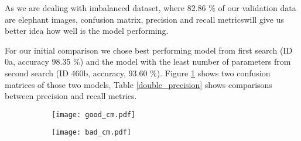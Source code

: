 As we are dealing with imbalanced dataset, where 82.86 \% of our validation data are elephant images, confusion matrix, precision and recall metrics\footnotemark will give us better idea how well is the model performing.


For our initial comparison we chose best performing model from first search (ID 0a, accuracy 98.35 \%) and the model with the least number of parameters from second search (ID 460b, accuracy, 93.60 \%).
Figure \ref{double_cm} shows two confusion matrices of those two models, Table \ref{double_precision} shows comparisons between precision and recall metrics.


\begin{figure}[ht]
    \begin{subfigure}{0.5\textwidth}
        \centering
        \texttt{[image: good\_cm.pdf]} 
    \end{subfigure}
    \begin{subfigure}{0.5\textwidth}
        \centering
        \texttt{[image: bad\_cm.pdf]}
    \end{subfigure}
    \caption{}
    \label{double_cm}
\end{figure}


